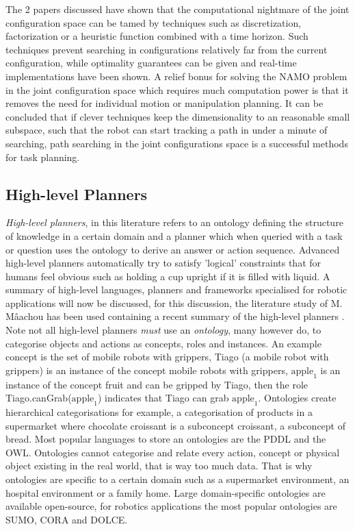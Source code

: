 The 2 papers discussed have shown that the computational nightmare of the joint configuration space can be tamed by techniques such as discretization, factorization or a heuristic function combined with a time horizon. Such techniques prevent searching in configurations relatively far from the current configuration, while optimality guarantees can be given and real-time implementations have been shown. A relief bonus for solving the \ac{NAMO} problem in the joint configuration space which requires much computation power is that it removes the need for individual motion or manipulation planning. It can be concluded that if clever techniques keep the dimensionality to an reasonable small subspace, such that the robot can start tracking a path in under a minute of searching, path searching in the joint configurations space is a successful methods for task planning.\\

\subsection{High-level Planners}
\label{subsection: high_level_planners}
\textit{High-level planners}, in this literature refers to an ontology defining the structure of knowledge in a certain domain and a planner which when queried with a task or question uses the ontology to derive an answer or action sequence. Advanced high-level planners automatically try to satisfy 'logical' constraints that for humans feel obvious such as holding a cup upright if it is filled with liquid. A summary of high-level languages, planners and frameworks specialised for robotic applications will now be discussed, for this discussion, the literature study of M. Mâachou has been used containing a recent summary of the high-level planners \cite{maachou_mohommed_knowledge-based_2021}. \\

Note not all high-level planners \textit{must} use an \textit{ontology}, many however do, to categorise objects and actions as concepts, roles and instances. An example concept is the set of mobile robots with grippers, Tiago (a mobile robot with grippers) is an instance of the concept mobile robots with grippers, $\text{apple}_1$ is an instance of the concept fruit and can be gripped by Tiago, then the role Tiago.canGrab($\text{apple}_1$) indicates that Tiago can grab $\text{apple}_1$. Ontologies create hierarchical categorisations for example, a categorisation of products in a supermarket where chocolate croissant is a subconcept croissant, a subconcept of bread. Most popular languages to store an ontologies are the \ac{PDDL} and the \ac{OWL}. Ontologies cannot categorise and relate every action, concept or physical object existing in the real world, that is way too much data. That is why ontologies are specific to a certain domain such as a supermarket environment, an hospital environment or a family home. Large domain-specific ontologies are available open-source, for robotics applications the most popular ontologies are \ac{SUMO}, \ac{CORA} and \ac{DOLCE}. \\

